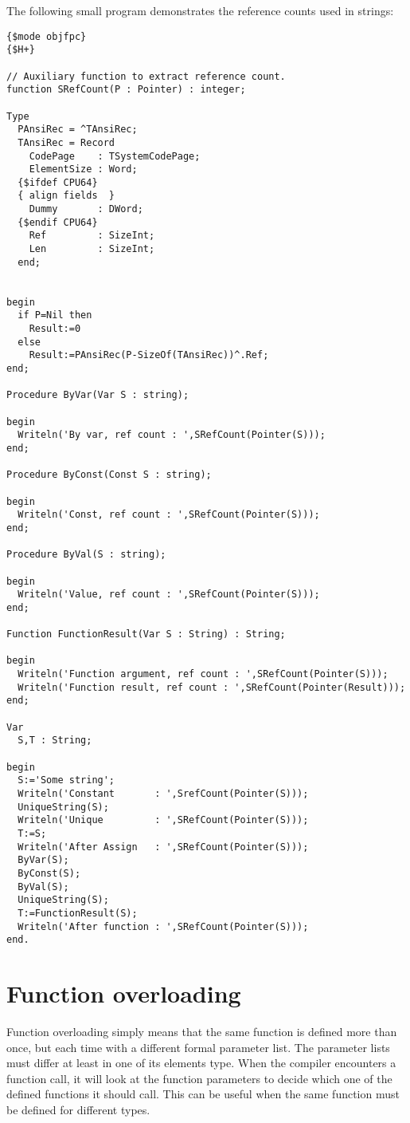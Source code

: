 The following small program demonstrates the reference counts used in strings:
\begin{verbatim}
{$mode objfpc}
{$H+}

// Auxiliary function to extract reference count.
function SRefCount(P : Pointer) : integer;

Type
  PAnsiRec = ^TAnsiRec;
  TAnsiRec = Record
    CodePage    : TSystemCodePage;
    ElementSize : Word;
  {$ifdef CPU64}
  { align fields  }
    Dummy       : DWord;
  {$endif CPU64}
    Ref         : SizeInt;
    Len         : SizeInt;
  end;


begin
  if P=Nil then
    Result:=0
  else
    Result:=PAnsiRec(P-SizeOf(TAnsiRec))^.Ref;
end;

Procedure ByVar(Var S : string);

begin
  Writeln('By var, ref count : ',SRefCount(Pointer(S)));
end;

Procedure ByConst(Const S : string);

begin
  Writeln('Const, ref count : ',SRefCount(Pointer(S)));
end;

Procedure ByVal(S : string);

begin
  Writeln('Value, ref count : ',SRefCount(Pointer(S)));
end;

Function FunctionResult(Var S : String) : String;

begin
  Writeln('Function argument, ref count : ',SRefCount(Pointer(S)));
  Writeln('Function result, ref count : ',SRefCount(Pointer(Result)));
end;

Var
  S,T : String;

begin
  S:='Some string';
  Writeln('Constant       : ',SrefCount(Pointer(S)));
  UniqueString(S);
  Writeln('Unique         : ',SRefCount(Pointer(S)));
  T:=S;
  Writeln('After Assign   : ',SRefCount(Pointer(S)));
  ByVar(S);
  ByConst(S);
  ByVal(S);
  UniqueString(S);
  T:=FunctionResult(S);
  Writeln('After function : ',SRefCount(Pointer(S)));
end.
\end{verbatim}


\section{Function overloading}
Function overloading simply means that the same function is defined more
than once, but each time with a different formal parameter list.
The parameter lists must differ at least in one of its elements type.
When the compiler encounters a function call, it will look at the function
parameters to decide which one of the defined functions it should call.
This can be useful when the same function must be defined for different
types. 

